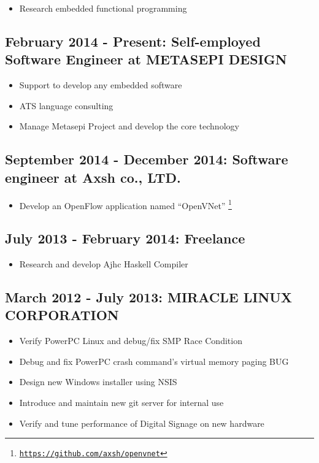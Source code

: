 \documentclass[letterpaper]{article}
\begin{document}
\begin{itemize}
  \item Research embedded functional programming
\end{itemize}

\subsection*{February 2014 - Present: Self-employed Software Engineer at METASEPI DESIGN}

\begin{itemize}
  \item Support to develop any embedded software
  \item ATS language consulting
  \item Manage Metasepi Project and develop the core technology
\end{itemize}

\subsection*{September 2014 - December 2014: Software engineer at Axsh co., LTD.}

\begin{itemize}
  \item Develop an OpenFlow application named ``OpenVNet'' \footnote{\href{https://github.com/axsh/openvnet}{\tt https://github.com/axsh/openvnet}}
\end{itemize}

\subsection*{July 2013 - February 2014: Freelance}

\begin{itemize}
  \item Research and develop Ajhc Haskell Compiler
\end{itemize}

\subsection*{March 2012 - July 2013: MIRACLE LINUX CORPORATION}

\begin{itemize}
  \item Verify PowerPC Linux and debug/fix SMP Race Condition
  \item Debug and fix PowerPC crash command's virtual memory paging BUG
  \item Design new Windows installer using NSIS
  \item Introduce and maintain new git server for internal use
  \item Verify and tune performance of Digital Signage on new hardware
\end{itemize}
\end{document}
